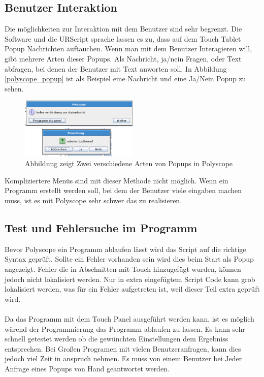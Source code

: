 \subsection{Benutzer Interaktion}
\label{user_interaktion_polyscope_rel}

Die möglichkeiten zur Interaktion mit dem Benutzer sind sehr begrenzt. Die Software und die URScript sprache lassen es zu, dass auf dem Touch Tablet Popup Nachrichten auftauchen. Wenn man mit dem Benutzer Interagieren will, gibt mehrere Arten dieser Popups.
Als Nachricht, ja/nein Fragen, oder Text abfragen, bei denen der Benutzer mit Text anworten soll. In Abbildung \ref{polyscope_popup} 
ist als Beispiel eine Nachricht und eine Ja/Nein Popup zu sehen.

\begin{figure}[ht]
  \centering
    \includegraphics[width=0.5\textwidth]{pic/popup_question.png}
      \caption[Popup in Polyscipe]{Abbildung zeigt Zwei verschiedene Arten von Popups in Polyscope}
      \label{fig:polyscope_popup}
\end{figure}

Kompliziertere Menüs sind mit dieser Methode nicht möglich. Wenn ein Programm erstellt werden soll, bei dem der Benutzer viele eingaben machen muss, ist es mit Polyscope sehr schwer das zu realisieren.

\subsection{Test und Fehlersuche im Programm}
\label{debuggin_polyscope_rel}

Bevor Polyscope ein Programm ablaufen lässt wird das Script auf die richtige Syntax geprüft. Sollte ein Fehler vorhanden sein wird dies beim Start als Popup angezeigt. Fehler die in Abschnitten mit Touch hinzugefügt wurden, können jedoch nicht lokalisiert werden. Nur in extra eingefügtem Script Code kann grob lokalisiert werden, was für ein Fehler aufgetreten ist, weil dieser Teil extra geprüft wird.
\\\\
Da das Programm mit dem Touch Panel ausgeführt werden kann, ist es möglich wärend der Programmierung das Programm ablaufen zu lassen. Es kann sehr schnell getestet werden ob die gewünchten Einstellungen dem Ergebniss entsprechen. Bei Großen Programen mit vielen Benutzeranfragen, kann dies jedoch viel Zeit in anspruch nehmen. Es muss von einem Benutzer bei Jeder Anfrage eines Popups von Hand geantwortet werden.

